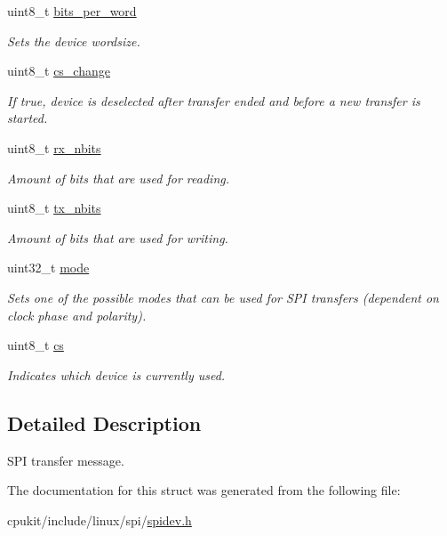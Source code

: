 \begin{DoxyCompactItemize}
uint8\+\_\+t \mbox{\hyperlink{group__SPILinux_ga7f3032fc0e3fcf7b7631ef651bb79317}{bits\+\_\+per\+\_\+word}}
\begin{DoxyCompactList}\small\item\em Sets the device wordsize. \end{DoxyCompactList}\item 
uint8\+\_\+t \mbox{\hyperlink{group__SPILinux_ga4bf035a0c6fdf0f478e6d005b56fdc38}{cs\+\_\+change}}
\begin{DoxyCompactList}\small\item\em If true, device is deselected after transfer ended and before a new transfer is started. \end{DoxyCompactList}\item 
uint8\+\_\+t \mbox{\hyperlink{group__SPILinux_ga638652ff3eca7e5f30c5c09619ec4bce}{rx\+\_\+nbits}}
\begin{DoxyCompactList}\small\item\em Amount of bits that are used for reading. \end{DoxyCompactList}\item 
uint8\+\_\+t \mbox{\hyperlink{group__SPILinux_gab6c226c9b46e6b4aaf9e7ddb325dcf24}{tx\+\_\+nbits}}
\begin{DoxyCompactList}\small\item\em Amount of bits that are used for writing. \end{DoxyCompactList}\item 
uint32\+\_\+t \mbox{\hyperlink{group__SPILinux_gaff60beee4311201da16eb1c65c1ad580}{mode}}
\begin{DoxyCompactList}\small\item\em Sets one of the possible modes that can be used for S\+PI transfers (dependent on clock phase and polarity). \end{DoxyCompactList}\item 
uint8\+\_\+t \mbox{\hyperlink{group__SPILinux_gae99061821e81f8f774f2db7ff813be7c}{cs}}
\begin{DoxyCompactList}\small\item\em Indicates which device is currently used. \end{DoxyCompactList}\end{DoxyCompactItemize}


\subsection{Detailed Description}
S\+PI transfer message. 

The documentation for this struct was generated from the following file\+:\begin{DoxyCompactItemize}
\item 
cpukit/include/linux/spi/\mbox{\hyperlink{spidev_8h}{spidev.\+h}}\end{DoxyCompactItemize}
